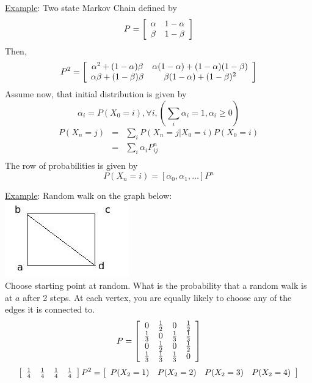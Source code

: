     \noindent \underline{Example}: Two state Markov Chain defined by
    $$
      P = \left[\begin{array}{c c} \alpha & 1 - \alpha\\ \beta & 1 - \beta
        \end{array}\right]
    $$
    Then,
    $$
      P^2 = \left[\begin{array}{c c} \alpha^2 + (1 - \alpha)\beta 
        & \alpha(1 - \alpha) + (1 -\alpha) (1 - \beta)\\ 
        \alpha\beta + (1 - \beta)\beta 
        & \beta(1 - \alpha) + (1 - \beta)^2
        \end{array}\right]
    $$
    Assume now, that initial distribution is given by
    $$
      \alpha_i = P(X_0 = i), \forall i, (\sum_i \alpha_i = 1, \alpha_i \ge 0)
    $$
    \begin{eqnarray*}
      P(X_n = j) & = & \sum_i P(X_n = j | X_0 = i)P(X_0 = i)\\
        & = & \sum_i \alpha_i P_{ij}^n\\
    \end{eqnarray*}
    The row of probabilities is given by
    $$
      P(X_n = i) = [\alpha_0, \alpha_1, \ldots ]P^n
    $$

    \noindent\underline{Example}: Random walk on the graph below:\\
    \includegraphics{4_20_2.jpeg}\\
    Choose starting point at random. What is the probability that a random
    walk is at $a$ after 2 steps. At each vertex, you are equally likely to
    choose any of the edges it is connected to.\\
    $$
      P = \left[\begin{array}{c c c c}
        0 &  \frac{1}{2} & 0 & \frac{1}{2}\\
        \frac{1}{3} & 0 & \frac{1}{3} & \frac{1}{3}\\
        0 & \frac{1}{2} & 0 & \frac{1}{2}\\
        \frac{1}{3} & \frac{1}{3} & \frac{1}{3} & 0
        \end{array}\right]
    $$
    $$
      \left[\begin{array}{c c c c} \frac{1}{4} & \frac{1}{4} & \frac{1}{4}
        & \frac{1}{4}\end{array}\right] P^2 = \left[\begin{array}{c c c c} P(X_2 = 1) & P(X_2 = 2) & P(X_2 = 3) & P(X_2 = 4)\end{array}\right]
    $$
